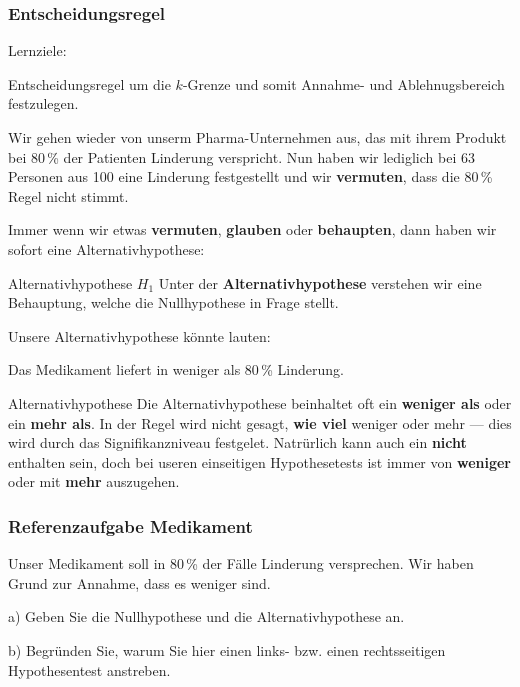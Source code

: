 
\subsubsection{Entscheidungsregel}
Lernziele:

Entscheidungsregel um die $k$-Grenze und somit Annahme- und
Ablehnugsbereich festzulegen.
\newpage 

Wir gehen wieder von unserm Pharma-Unternehmen aus, das mit ihrem Produkt bei 80\,\% der Patienten Linderung verspricht.
Nun haben wir lediglich bei 63 Personen aus 100 eine Linderung festgestellt und wir \textbf{vermuten}, dass die 80\,\% Regel nicht stimmt.

Immer wenn wir etwas \textbf{vermuten}, \textbf{glauben} oder \textbf{behaupten}, dann haben wir sofort eine Alternativhypothese:


\begin{definition}{Alternativhypothese $H_1$}{}
Unter der \textbf{Alternativhypothese} verstehen wir eine Behauptung, welche die Nullhypothese in Frage stellt.
\end{definition}

Unsere Alternativhypothese könnte lauten:

\begin{center}Das Medikament liefert in weniger als 80\,\% Linderung.\end{center}

\begin{bemerkung}{Alternativhypothese}{}
  Die Alternativhypothese beinhaltet oft ein \textbf{weniger als} oder ein \textbf{mehr als}. In der Regel wird nicht gesagt, \textbf{wie viel} weniger oder mehr --- dies wird durch das Signifikanzniveau festgelet. Natrürlich kann auch ein \textbf{nicht} enthalten sein, doch bei useren einseitigen Hypothesetests ist immer von \textbf{weniger} oder mit \textbf{mehr} auszugehen.
\end{bemerkung}

\newpage
\subsubsection{Referenzaufgabe Medikament}
Unser Medikament soll in 80\,\% der Fälle Linderung versprechen. Wir haben Grund zur Annahme, dass es weniger sind.

a) Geben Sie die Nullhypothese und die Alternativhypothese an.


b) Begründen Sie, warum Sie hier einen links- bzw. einen rechtsseitigen Hypothesentest anstreben.

\newpage
